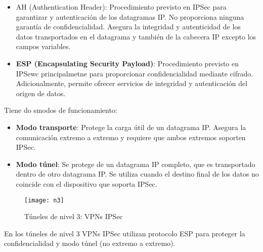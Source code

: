 \documentclass[10pt,portrait, twocolumn]{article}
\begin{document}
	\begin{itemize}
	\item AH (Authentication Header): Procedimiento previsto en IPSec para garantizar y autenticación de los datagramas IP. No proporciona ninguna garantía de confidencialidad. Asegura la integridad y autenticidad de los datos transportados en el datagrama y también de la cabecera IP excepto los campos variables.
	\item \textbf{ESP (Encapsulating Security Payload)}: Procedimiento previsto en IPSewc principalmetne para proporcionar confidencialidad mediante cifrado. Adicionalmente, permite ofrecer servicios de integridad  y autenticación del origen de datos.
	\end{itemize}
	
Tiene do smodos de funcionamiento:

	\begin{itemize}
		\item \textbf{Modo transporte}: Protege la carga útil de un datagrama IP. Asegura la comunicación extremo a extremo y requiere que ambos extremos soporten IPSec.
		\item \textbf{Modo túnel}: Se protege de un datagrama IP completo, que es transportado dentro de otro datagrama IP.  Se utiliza cuando el destino final de los datos no coincide con el dispositivo que soporta IPSec.
	\end{itemize}


	\begin{figure}[!ht]	
	\centering
    	\texttt{[image: n3]}
	\caption{Túneles de nivel 3: VPNs IPSec}
	\label{fig:GRE}
	\end{figure} 
	
En los túneles de nivel 3 VPNs IPSec utilizan protocolo ESP para proteger la confidencialidad y modo túnel (no extremo a extremo).

\hrulefill
	
	
	




\end{document}
